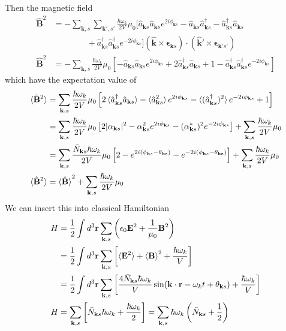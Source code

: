 \documentclass[../../../main.tex]{subfiles}
\begin{document}
Then the magnetic field
\begin{align*}
  \hat{\mathbf{B}}^2
   & =-  \sum_{\mathbf{k},s} \sum_{\mathbf{k}',s'} \frac{\hbar \omega_k}{2 V} \mu_0
  \bigg[ \hat{a}_{\mathbf{k }s} \hat{a}_{\mathbf{k }s}  e ^{2i\phi_{\mathbf{k }s}} -\hat{a}_{\mathbf{k }s} \hat{a}^\dagger_{\mathbf{k }s} -\hat{a}^\dagger_{\mathbf{k }s} \hat{a}_{\mathbf{k }s} \\
   & \qquad\qquad+\hat{a}^\dagger_{\mathbf{k }s} \hat{a}^\dagger_{\mathbf{k }s} e ^{-2i\phi_{\mathbf{k }s}} \bigg]
  (\mathbf{\hat{k}} \times \boldsymbol{\epsilon}_{\mathbf{k}s}) \cdot (\mathbf{\hat{k}'} \times \boldsymbol{\epsilon}_{\mathbf{k}'s'})                                                           \\
  \hat{\mathbf{B}}^2
   & =-  \sum_{\mathbf{k},s} \frac{\hbar \omega_k}{2 V} \mu_0
  \left[ -\hat{a}_{\mathbf{k }s} \hat{a}_{\mathbf{k }s}  e ^{2i\phi_{\mathbf{k }s}}+ 2 \hat{a}^\dagger_{\mathbf{k }s} \hat{a}_{\mathbf{k }s} +1 -\hat{a}^\dagger_{\mathbf{k }s} \hat{a}^\dagger_{\mathbf{k }s} e ^{-2i\phi_{\mathbf{k }s}} \right]
\end{align*}
which have the expectation value of 
\begin{align*}
  \braket{  \hat{\mathbf{B}}^2 }
   & = \sum_{\mathbf{k},s} \frac{\hbar \omega_k}{2 V} \mu_0
  \left[2\braket{ \hat{a}^\dagger_{\mathbf{k }s} \hat{a}_{\mathbf{k }s} } -\braket{\hat{a}_{\mathbf{k }s} ^2}  e ^{2i\phi_{\mathbf{k }s}}   - \braket{(\hat{a}^\dagger_{\mathbf{k }s} )^2} e ^{-2i\phi_{\mathbf{k }s}} +1 \right] \\
   & = \sum_{\mathbf{k},s} \frac{\hbar \omega_k}{2 V} \mu_0
  \left[ 2|\alpha_{\mathbf{k }s}|^2 -\alpha_{\mathbf{k }s}^2e ^{2i\phi_{\mathbf{k }s}} - (\alpha_{\mathbf{k }s }^*)^2e ^{-2i\phi_{\mathbf{k }s}}\right] + \sum_{\mathbf{k },s}\frac{\hbar \omega_k}{2 V} \mu_0               \\
   & = \sum_{\mathbf{k},s} \frac{\bar{N }_{\mathbf{k }s}\hbar \omega_k}{2 V} \mu_0
  \left[ 2 -e ^{2i(\phi_{\mathbf{k }s}-\theta_{\mathbf{ks}})} - e^{-2i (\phi_{\mathbf{k }s}-\theta_{\mathbf{ks}})}\right] + \sum_{\mathbf{k },s}\frac{\hbar \omega_k}{2 V} \mu_0\\
  \braket{  \hat{\mathbf{B}}^2 }
   & = \braket{\hat{\mathbf{B}} }^2+\sum_{\mathbf{k },s}\frac{\hbar \omega_k}{2 V} \mu_0
\end{align*}
We can insert this into classical Hamiltonian
\begin{align*}
  H & =   \frac{1}{ 2}\int d^3 \mathbf{r} \sum_{\mathbf{k},s} \left( \epsilon_0\mathbf{E}^2 + \frac{1}{\mu_0} \mathbf{B}^2 \right)        \\
    & = \frac{1 }{2} \int d^3 \mathbf{r } \sum_{\mathbf{k},s} \left[ \braket{\mathbf{E}^2 }+\braket{\mathbf{B} }^2 +\frac{\hbar \omega_k }{V}\right] \\
    & = \frac{1 }{2} \int d^3 \mathbf{r } \sum_{\mathbf{k},s} \left[ \frac{4 \bar{N }_{\mathbf{k }s }\hbar \omega_k }{V }\sin (\mathbf{k }\cdot \mathbf{r }-\omega_kt+\theta_{\mathbf{k }s})+\frac{\hbar \omega_k }{V}\right] \\
  H & = \sum_{\mathbf{k },s}\left[ \bar{N }_{\mathbf{k }s}\hbar \omega_k+\frac{\hbar \omega_k }{2} \right]=  \sum_{\mathbf{k},s} \hbar \omega_k \left( \bar{N}_{\mathbf{k }s}+\frac{1 }{2} \right)
\end{align*}
\end{document}
